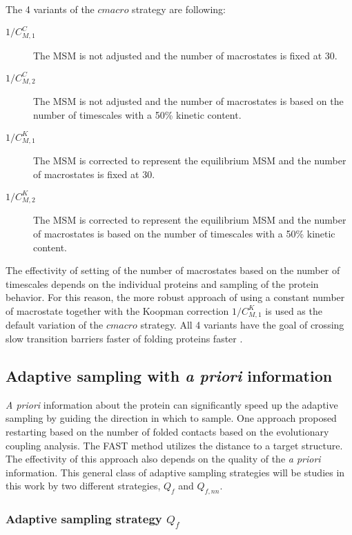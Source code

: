 The 4 variants of the $cmacro$ strategy are following:
\begin{description}
\item[$1/C_{M,1}^C$]
The MSM is not adjusted and the number of macrostates is fixed at 30.
\item[$1/C_{M,2}^C$]
The MSM is not adjusted and the number of macrostates is based on the number of timescales with a 50\% kinetic content.
\item[$1/C_{M,1}^K$]
The MSM is corrected to represent the equilibrium MSM and the number of macrostates is fixed at 30.
\item[$1/C_{M,2}^K$]
The MSM is corrected to represent the equilibrium MSM and the number of macrostates is based on the number of timescales with a 50\% kinetic content.
\end{description}

The effectivity of setting of the number of macrostates based on the number of timescales depends on the individual proteins and sampling of the protein behavior.
For this reason, the more robust approach of using a constant number of macrostate together with the Koopman correction $1/C_{M,1}^K$ is used as the default variation of the $cmacro$ strategy.
All 4 variants have the goal of crossing slow transition barriers faster of folding proteins faster \cite{Adstrategies2018}.


\subsection{Adaptive sampling with \emph{a priori} information}

\emph{A priori} information about the protein can significantly speed up the adaptive sampling by guiding the direction in which to sample. One approach \cite{EvolutionCoupling-Shamsi2017} proposed restarting based on the number of folded contacts based on the evolutionary coupling analysis. The FAST method \cite{FAST-Bowman-2015} utilizes the distance to a target structure. The effectivity of this approach also depends on the quality of the \emph{a priori} information. This general class of adaptive sampling strategies will be studies in this work by two different strategies, $Q_{f}$  and $Q_{f,nn}$.  

\subsubsection{Adaptive sampling strategy $Q_{f}$}

